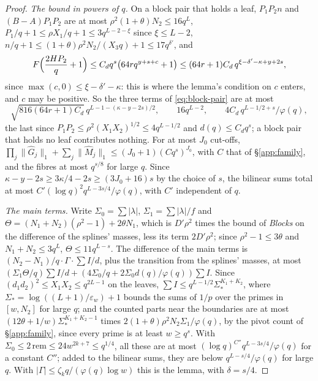 \documentclass[11pt]{article}
\numberwithin{equation}{section}
\begin{document}
\begin{proof}
\emph{The bound in powers of $q$.} On a block pair that holds a leaf, $P_1 P_2 n$ and $(B - A) P_1 P_2$ are at most
$\rho^2(1 + \theta) N_2 \le 16 q^L$, $P_1/q + 1 \le \rho X_1/q + 1 \le 3q^{L - 2 - \xi}$ since $\xi \le L - 2$, $n/q + 1
\le
(1 + \theta)\rho^2 N_2/(X_3 q) + 1 \le 17 q^{\delta'}$, and
\[
  F\Bigl(\frac{2HP_2}q + 1\Bigr) \le C_d q^s \bigl(64 r q^{y + s + c} + 1\bigr)
  \le (64r + 1) C_d \, q^{\xi - \delta' - \kappa + y + 2s},
\]
since $\max(c, 0) \le \xi - \delta' - \kappa$: this is where the lemma's condition on $c$ enters, and $c$ may be
positive.
So the three terms of \eqref{eq:block-pair} are at most
\[
  \sqrt{816(64r + 1) C_d} \, q^{L - 1 - (\kappa - y - 2s)/2}, \qquad 16 q^{L - 2}, \qquad
  4C_d \, q^{L - 1/2 + s}/\varphi(q),
\]
the last since $P_1 P_2 \le \rho^2 (X_1 X_2)^{1/2} \le 4q^{L - 1/2}$ and $d(q) \le C_d q^s$; a block pair that holds no
leaf contributes nothing. For at most $J_0$ cut-offs, $\prod_j \|\hat G_j\|_1 + \sum_j \|\hat M_j\|_1 \le (J_0 +
1)(C q^s)^{J_0}$, with $C$
that of \S\ref{app:family}, and the fibres at most $q^{s/8}$ for large $q$. Since $\kappa - y - 2s \ge 3\kappa/4 - 2s
\ge (3J_0 + 16)s$ by the choice of $s$, the bilinear sums total at most $C'(\log q)^2 q^{L - 3s/4}/\varphi(q)$, with
$C'$ independent of $q$.

\emph{The main terms.} Write $\Sigma_0 = \sum |\lambda|$, $\Sigma_1 = \sum |\lambda|/f$ and $\Theta = (N_1 + N_2)(\rho^2
- 1) + 2\theta N_1$, which is $D'\rho^2$ times the bound of \emph{Blocks} on the difference of the splines' masses, less
its term $2D'\rho^2$; since $\rho^2 - 1 \le 3\theta$ and $N_1 + N_2 \le 3q^L$, $\Theta \le 11 q^{L - s}$. The
difference of the main terms is $(N_2 - N_1)/q \cdot \Gamma \cdot \sum I/d$, plus the transition from the splines'
masses, at most $(\Sigma_1 \Theta/q) \sum I/d + (4\Sigma_0/q + 2\Sigma_0 d(q)/\varphi(q)) \sum I$. Since $(d_1
d_2)^2 \le X_1 X_2 \le q^{2L - 1}$ on the leaves, $\sum I \le q^{L - 1/2} \Sigma_*^{K_1 + K_2}$, where $\Sigma_* =
\log((L + 1)/\varepsilon_w) + 1$ bounds the sums of $1/p$ over the primes in $[w, N_2]$ for large $q$; and the counted
parts near the boundaries are at most $(12\theta + 1/w) \Sigma_*^{K_1 + K_2 - 1}$ times $2(1 + \theta)\rho^2 N_2
\Sigma_1/\varphi(q)$, by the pivot count of \S\ref{app:family}, since every prime is at least $w \ge q^s$. With
$\Sigma_0 \le 2\,\mathrm{rem} \le
24 w^{2k + 7} \le q^{1/4}$, all these are at most $(\log q)^{C''} q^{L - 3s/4}/\varphi(q)$ for a constant $C''$; added
to the bilinear sums, they are below $q^{L - s/4}/\varphi(q)$ for large $q$. With $|\Gamma| \le \zeta_k q/(\varphi(q)
\log w)$ this is the lemma, with $\delta = s/4$.
\end{proof}
\end{document}

